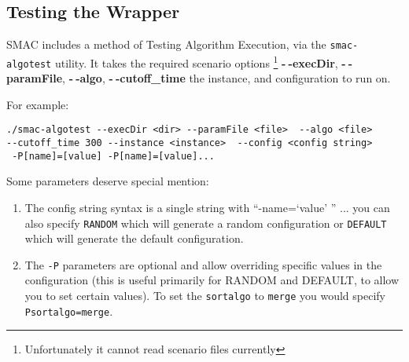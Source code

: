 \subsection{Testing the Wrapper}

SMAC includes a method of Testing Algorithm Execution, via the \texttt{smac-algotest} utility. It takes the required scenario options \footnote{Unfortunately it cannot read scenario files currently}
 \textbf{-$~\!$-execDir}, \textbf{-$~\!$-paramFile}, \textbf{-$~\!$-algo}, \textbf{-$~\!$-cutoff\_time} the instance, and configuration to run on.

For example:
\begin{verbatim} 
./smac-algotest --execDir <dir> --paramFile <file>  --algo <file> 
--cutoff_time 300 --instance <instance>  --config <config string>
 -P[name]=[value] -P[name]=[value]...
\end{verbatim}

Some parameters deserve special mention:
\begin{enumerate}
\item The config string syntax is a single string with ``-name=`value' '' ... you can also specify \texttt{RANDOM} which will generate a random configuration or \texttt{DEFAULT} which will generate  the default configuration.

\item The \texttt{-P} parameters are optional and allow overriding specific values in the configuration (this is useful primarily for RANDOM and DEFAULT, to allow you to set certain values). To set the \texttt{sort\-algo} to \texttt{merge} you would specify \texttt{\-Psort\-algo=merge}.
\end{enumerate}

